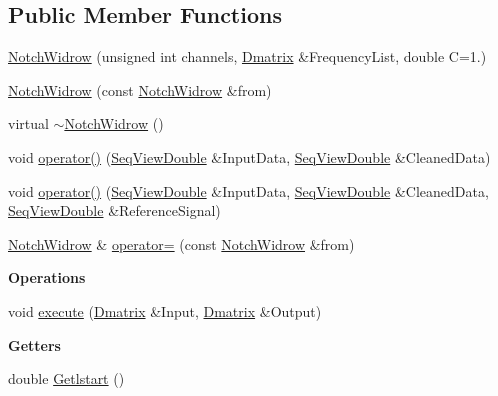 \subsection*{Public Member Functions}
\begin{DoxyCompactItemize}
\item 
\hyperlink{classtsa_1_1_notch_widrow_a7e25ed1b1078586eeba5042708604f3c}{Notch\+Widrow} (unsigned int channels, \hyperlink{namespacetsa_ad260cd21c1891c4ed391fe788569aba4}{Dmatrix} \&Frequency\+List, double C=1.)
\item 
\hyperlink{classtsa_1_1_notch_widrow_a035983c44683b3cebc0cc658625766f8}{Notch\+Widrow} (const \hyperlink{classtsa_1_1_notch_widrow}{Notch\+Widrow} \&from)
\item 
virtual \hyperlink{classtsa_1_1_notch_widrow_a6001ad30b1394347df1be5d9a77a46de}{$\sim$\+Notch\+Widrow} ()
\item 
void \hyperlink{classtsa_1_1_notch_widrow_af11452f632cdcb6587b6e38902739418}{operator()} (\hyperlink{namespacetsa_ac599574bcc094eda25613724b8f3ca9e}{Seq\+View\+Double} \&Input\+Data, \hyperlink{namespacetsa_ac599574bcc094eda25613724b8f3ca9e}{Seq\+View\+Double} \&Cleaned\+Data)
\item 
void \hyperlink{classtsa_1_1_notch_widrow_a1a5e3856299c5c1ee5f395dcf3a84b45}{operator()} (\hyperlink{namespacetsa_ac599574bcc094eda25613724b8f3ca9e}{Seq\+View\+Double} \&Input\+Data, \hyperlink{namespacetsa_ac599574bcc094eda25613724b8f3ca9e}{Seq\+View\+Double} \&Cleaned\+Data, \hyperlink{namespacetsa_ac599574bcc094eda25613724b8f3ca9e}{Seq\+View\+Double} \&Reference\+Signal)
\item 
\hyperlink{classtsa_1_1_notch_widrow}{Notch\+Widrow} \& \hyperlink{classtsa_1_1_notch_widrow_a5742384848310dde0e8cc5ffc8a59b22}{operator=} (const \hyperlink{classtsa_1_1_notch_widrow}{Notch\+Widrow} \&from)
\end{DoxyCompactItemize}
\begin{Indent}\textbf{ Operations}\par
\begin{DoxyCompactItemize}
\item 
void \hyperlink{classtsa_1_1_notch_widrow_a40d73f3abe99c4e73d392f68317298c7}{execute} (\hyperlink{namespacetsa_ad260cd21c1891c4ed391fe788569aba4}{Dmatrix} \&Input, \hyperlink{namespacetsa_ad260cd21c1891c4ed391fe788569aba4}{Dmatrix} \&Output)
\end{DoxyCompactItemize}
\end{Indent}
\begin{Indent}\textbf{ Getters}\par
\begin{DoxyCompactItemize}
\item 
double \hyperlink{classtsa_1_1_notch_widrow_a036b5be767039465601378f76a4f013d}{Getlstart} ()
\end{DoxyCompactItemize}
\end{Indent}
